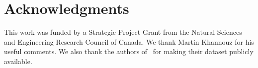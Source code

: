 \documentclass[sigconf]{acmart}
\begin{document}
\section{Acknowledgments}

This work was funded by a Strategic Project Grant from the Natural Sciences and Engineering Research Council of Canada. We thank Martin Khannouz for his useful comments. We also thank the authors of~\cite{banos2014window} for making their dataset publicly available.

\balance


\end{document}

